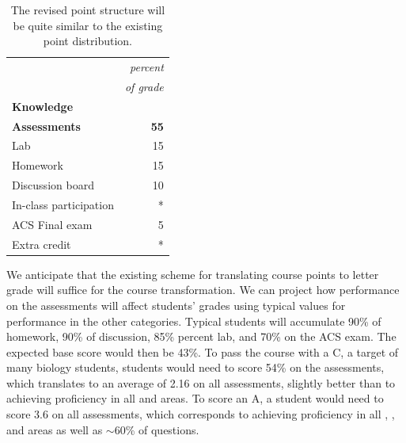 \documentclass[10pt,letterpaper]{article}
\begin{document}
\begin{table}
\sffamily\footnotesize
\begin{tabular}{lr}
&\textit{percent}\\
&\textit{of grade}\\
\textbf{Knowledge}&\\
\textbf{Assessments} & \textbf{55}\\
Lab  & 15\\
Homework  & 15\\
Discussion board  & 10\\
In-class participation  & *\\ 
ACS Final exam  & 5\\
Extra credit  & *
\end{tabular}
\caption{\label{tbl:grading_scheme_mockup}
The revised point structure will be quite similar to the existing point distribution.} 
\end{table}

%
We anticipate that the existing scheme for translating course points to letter grade will suffice for the course transformation. We can project how performance on the assessments will affect students' grades using typical values for performance in the other categories. Typical students will accumulate 90\% of homework, 90\% of discussion, 85\% percent lab, and 70\% on the ACS exam. The expected base score would then be 43\%. To pass the course with a C, a target of many biology students, students would need to score  54\% on the assessments, which translates to an average of 2.16 on all assessments, \ie slightly better than to achieving proficiency in all \recall and \comprehension areas. To score an A, a student would need to score 3.6 on all assessments, which corresponds to achieving proficiency in all \recall, \comprehension, and \analysis areas as well as $\sim60$\% of \use questions. 
\end{document}
